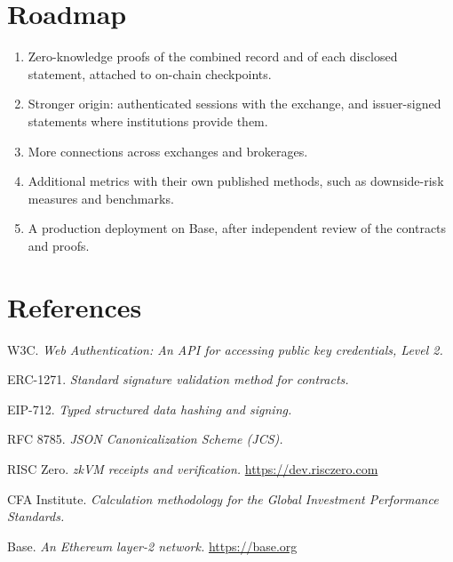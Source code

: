 \documentclass[11pt,a4paper]{article}
\begin{document}
\section{Roadmap}
\begin{enumerate}[leftmargin=1.4em,itemsep=0.2em]
\item Zero-knowledge proofs of the combined record and of each disclosed statement, attached to on-chain checkpoints.
\item Stronger origin: authenticated sessions with the exchange, and issuer-signed statements where institutions provide them.
\item More connections across exchanges and brokerages.
\item Additional metrics with their own published methods, such as downside-risk measures and benchmarks.
\item A production deployment on Base, after independent review of the contracts and proofs.
\end{enumerate}

\section*{References}
\begingroup\small\setlength{\parskip}{0.35em}
\begin{enumerate}[leftmargin=1.6em,label={[\arabic*]}]
\item W3C. \emph{Web Authentication: An API for accessing public key credentials, Level 2.}
\item ERC-1271. \emph{Standard signature validation method for contracts.}
\item EIP-712. \emph{Typed structured data hashing and signing.}
\item RFC 8785. \emph{JSON Canonicalization Scheme (JCS).}
\item RISC Zero. \emph{zkVM receipts and verification.} \url{https://dev.risczero.com}
\item CFA Institute. \emph{Calculation methodology for the Global Investment Performance Standards.}
\item Base. \emph{An Ethereum layer-2 network.} \url{https://base.org}
\end{enumerate}
\endgroup
\end{document}

